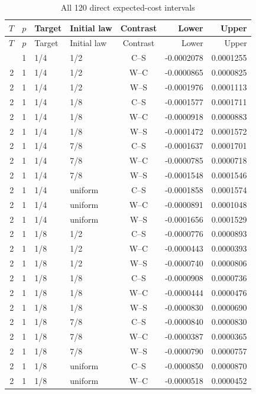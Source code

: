 \begin{longtable}{rrllcrr}\caption{All 120 direct expected-cost intervals}\label{tab:directfull47}\\\toprule
$T$ & $p$ & Target & Initial law & Contrast & Lower & Upper\\\midrule\endfirsthead
\toprule $T$ & $p$ & Target & Initial law & Contrast & Lower & Upper\\\midrule\endhead
\bottomrule\endfoot
2 & 1 & 1/4 & 1/2 & C--S & -0.0002078 & 0.0001255 \\
2 & 1 & 1/4 & 1/2 & W--C & -0.0000865 & 0.0000825 \\
2 & 1 & 1/4 & 1/2 & W--S & -0.0001976 & 0.0001113 \\
2 & 1 & 1/4 & 1/8 & C--S & -0.0001577 & 0.0001711 \\
2 & 1 & 1/4 & 1/8 & W--C & -0.0000918 & 0.0000883 \\
2 & 1 & 1/4 & 1/8 & W--S & -0.0001472 & 0.0001572 \\
2 & 1 & 1/4 & 7/8 & C--S & -0.0001637 & 0.0001701 \\
2 & 1 & 1/4 & 7/8 & W--C & -0.0000785 & 0.0000718 \\
2 & 1 & 1/4 & 7/8 & W--S & -0.0001548 & 0.0001546 \\
2 & 1 & 1/4 & uniform & C--S & -0.0001858 & 0.0001574 \\
2 & 1 & 1/4 & uniform & W--C & -0.0000891 & 0.0001048 \\
2 & 1 & 1/4 & uniform & W--S & -0.0001656 & 0.0001529 \\
2 & 1 & 1/8 & 1/2 & C--S & -0.0000776 & 0.0000893 \\
2 & 1 & 1/8 & 1/2 & W--C & -0.0000443 & 0.0000393 \\
2 & 1 & 1/8 & 1/2 & W--S & -0.0000740 & 0.0000806 \\
2 & 1 & 1/8 & 1/8 & C--S & -0.0000908 & 0.0000736 \\
2 & 1 & 1/8 & 1/8 & W--C & -0.0000444 & 0.0000476 \\
2 & 1 & 1/8 & 1/8 & W--S & -0.0000830 & 0.0000690 \\
2 & 1 & 1/8 & 7/8 & C--S & -0.0000840 & 0.0000830 \\
2 & 1 & 1/8 & 7/8 & W--C & -0.0000387 & 0.0000365 \\
2 & 1 & 1/8 & 7/8 & W--S & -0.0000790 & 0.0000757 \\
2 & 1 & 1/8 & uniform & C--S & -0.0000850 & 0.0000870 \\
2 & 1 & 1/8 & uniform & W--C & -0.0000518 & 0.0000452 \\

\end{longtable}
